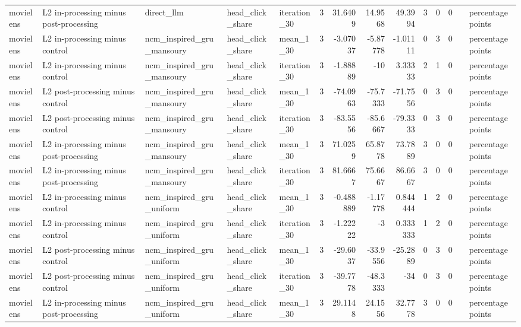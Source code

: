 \begin{table}[htbp!]
\begin{tabular}{lllllrrrrrrrll}
movielens & L2 in-processing minus post-processing & direct\_llm & head\_click\_share & iteration\_30 & 3 & 31.6409 & 14.9568 & 49.3994 & 3 & 0 & 0 &  & percentage points \\
movielens & L2 in-processing minus control & ncm\_inspired\_gru\_mansoury & head\_click\_share & mean\_1\_30 & 3 & -3.07037 & -5.87778 & -1.01111 & 0 & 3 & 0 &  & percentage points \\
movielens & L2 in-processing minus control & ncm\_inspired\_gru\_mansoury & head\_click\_share & iteration\_30 & 3 & -1.88889 & -10 & 3.33333 & 2 & 1 & 0 &  & percentage points \\
movielens & L2 post-processing minus control & ncm\_inspired\_gru\_mansoury & head\_click\_share & mean\_1\_30 & 3 & -74.0963 & -75.7333 & -71.7556 & 0 & 3 & 0 &  & percentage points \\
movielens & L2 post-processing minus control & ncm\_inspired\_gru\_mansoury & head\_click\_share & iteration\_30 & 3 & -83.5556 & -85.6667 & -79.3333 & 0 & 3 & 0 &  & percentage points \\
movielens & L2 in-processing minus post-processing & ncm\_inspired\_gru\_mansoury & head\_click\_share & mean\_1\_30 & 3 & 71.0259 & 65.8778 & 73.7889 & 3 & 0 & 0 &  & percentage points \\
movielens & L2 in-processing minus post-processing & ncm\_inspired\_gru\_mansoury & head\_click\_share & iteration\_30 & 3 & 81.6667 & 75.6667 & 86.6667 & 3 & 0 & 0 &  & percentage points \\
movielens & L2 in-processing minus control & ncm\_inspired\_gru\_uniform & head\_click\_share & mean\_1\_30 & 3 & -0.488889 & -1.17778 & 0.844444 & 1 & 2 & 0 &  & percentage points \\
movielens & L2 in-processing minus control & ncm\_inspired\_gru\_uniform & head\_click\_share & iteration\_30 & 3 & -1.22222 & -3 & 0.333333 & 1 & 2 & 0 &  & percentage points \\
movielens & L2 post-processing minus control & ncm\_inspired\_gru\_uniform & head\_click\_share & mean\_1\_30 & 3 & -29.6037 & -33.9556 & -25.2889 & 0 & 3 & 0 &  & percentage points \\
movielens & L2 post-processing minus control & ncm\_inspired\_gru\_uniform & head\_click\_share & iteration\_30 & 3 & -39.7778 & -48.3333 & -34 & 0 & 3 & 0 &  & percentage points \\
movielens & L2 in-processing minus post-processing & ncm\_inspired\_gru\_uniform & head\_click\_share & mean\_1\_30 & 3 & 29.1148 & 24.1556 & 32.7778 & 3 & 0 & 0 &  & percentage points \\

\end{tabular}
\end{table}
